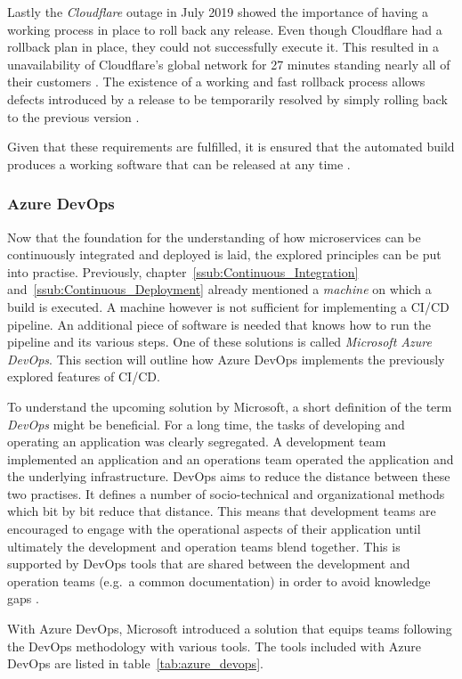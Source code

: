 Lastly the \textit{Cloudflare} outage in July 2019 showed the importance of
having a working process in place to roll back any release. Even though
Cloudflare had a rollback plan in place, they could not successfully execute
it. This resulted in a unavailability of Cloudflare's global network for 27
minutes standing nearly all of their customers
\autocite{Graham-CummingDetailsCloudflareoutage2019}. The existence of a
working and fast rollback process allows defects introduced by a release to be
temporarily resolved by simply rolling back to the previous version
\autocite[p. 199]{MatyasContinuousIntegration2007}.

Given that these requirements are fulfilled, it is ensured that the automated
build produces a working software that can be released at any time \autocite[p.
200]{MatyasContinuousIntegration2007}.

\subsubsection{Azure DevOps}%
\label{ssub:Azure_DevOps}
Now that the foundation for the understanding of how microservices can be
continuously integrated and deployed is laid, the explored principles can be
put into practise. Previously, chapter~\ref{ssub:Continuous_Integration}
and~\ref{ssub:Continuous_Deployment} already mentioned a \textit{machine} on
which a build is executed. A machine however is not sufficient for implementing
a \ac{CI}/\ac{CD} pipeline. An additional piece of software is needed that
knows how to run the pipeline and its various steps. One of these solutions is
called \textit{Microsoft Azure DevOps}. This section will outline how Azure
DevOps implements the previously explored features of \ac{CI}/\ac{CD}.

To understand the upcoming solution by Microsoft, a short definition of the
term \textit{DevOps} might be beneficial. For a long time, the tasks of
developing and operating an application was clearly segregated. A development
team implemented an application and an operations team operated the application
and the underlying infrastructure. DevOps aims to reduce the distance between
these two practises. It defines a number of socio-technical and organizational
methods which bit by bit reduce that distance. This means that development
teams are encouraged to engage with the operational aspects of their
application until ultimately the development and operation teams blend
together. This is supported by DevOps tools that are shared between the
development and operation teams (e.g.\ a common documentation) in order to
avoid knowledge gaps \autocite{ArtacDevOpsIntroducingInfrastructure2017}.

With Azure DevOps, Microsoft introduced a solution that equips teams following
the DevOps methodology with various tools. The tools included with Azure DevOps
are listed in table~\ref{tab:azure_devops}.

